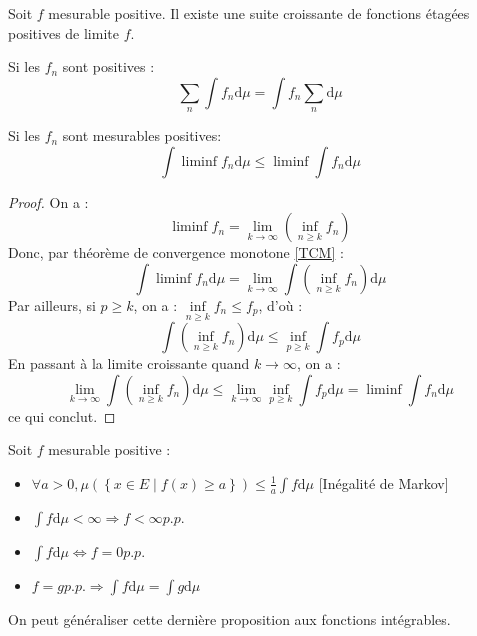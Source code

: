 \documentclass{cours}
\begin{document}
    \begin{theorem}
        Soit $f$ mesurable positive. Il existe une suite croissante de fonctions étagées positives de limite $f$.
    \end{theorem}
    \begin{corollary}
        Si les $f_{n}$ sont positives : \[
          \sum_{n} \int f_{n} \mathrm{d}\mu = \int f_{n} \sum_{n }\mathrm{d}\mu
        \]
    \end{corollary}
    \begin{theorem}
        Si les $f_{n}$ sont mesurables positives: 
        \[
            \int \liminf f_{n} \mathrm{d}\mu \leq \liminf \int f_{n} \mathrm{d}\mu
        \]
    \end{theorem}

    \begin{proof}
        On a : \[
            \liminf f_{n} = \lim_{k \to \infty} (\inf_{n \geq k} f_{n})        \]
        Donc, par théorème de convergence monotone \ref{TCM} : \[
            \int \liminf f_{n} \mathrm{d}\mu = \lim_{k \to \infty} \int \left(\inf_{n \geq k} f_{n}\right) \mathrm{d}\mu
        \]
        Par ailleurs, si $p \geq k$, on a : $\inf\limits_{n \geq k} f_{n} \leq f_{p}$, d'où : \[
            \int \left(\inf_{n \geq k} f_{n}\right) \mathrm{d}\mu \leq \inf_{p\geq k} \int f_{p} \mathrm{d}\mu
        \]
        En passant à la limite croissante quand $k \to \infty$, on a : \[   
            \lim_{k \to \infty} \int \left(\inf_{n \geq k} f_{n}\right)\mathrm{d}\mu \leq \lim_{k \to \infty} \inf_{p \geq k} \int f_{p} \mathrm{d}\mu = \liminf \int f_{n} \mathrm{d}\mu
        \]
        ce qui conclut.
    \end{proof}

    \begin{proposition}
        Soit $f$ mesurable positive :
        \begin{itemize}
            \item $\forall a > 0, \mu \left(\left\{x \in E \mid f(x) \geq a\right\}\right) \leq \frac{1}{a}\int f \mathrm{d} \mu$ [Inégalité de Markov]
            \item $\int f \mathrm{d}\mu < \infty \Rightarrow f < \infty p.p.$
            \item $\int f \mathrm{d}\mu \Leftrightarrow f = 0 p.p.$
            \item $f = g p.p. \Rightarrow \int f \mathrm{d}\mu = \int g \mathrm{d}\mu$
        \end{itemize}
        On peut généraliser cette dernière proposition aux fonctions intégrables.
    \end{proposition}
\end{document}
